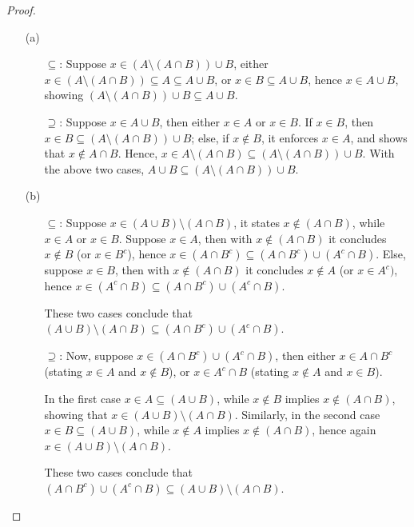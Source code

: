 \documentclass{article}
\begin{document}
\begin{proof}
    \begin{itemize}
        \item[(a)]
        \begin{itemize}
            \item[$\subseteq$:] Suppose $x\in (A\setminus (A\cap B))\cup B$, either $x\in (A\setminus (A\cap B))\subseteq A\subseteq A\cup B$, or $x\in B\subseteq A\cup B$, hence $x\in A\cup B$, showing $(A\setminus (A\cap B))\cup B\subseteq A\cup B$.
            \item[$\supseteq$:] Suppose $x\in A\cup B$, then either $x\in A$ or $x\in B$. If $x\in B$, then $x\in B\subseteq (A\setminus(A\cap B))\cup B$; else, if $x\notin B$, it enforces $x\in A$, and shows that $x\notin A\cap B$. Hence, $x\in A\setminus(A\cap B) \subseteq (A\setminus(A\cap B))\cup B$. With the above two cases, $A\cup B\subseteq (A\setminus(A\cap B))\cup B$.
        \end{itemize}
        \item[(b)]
        \begin{itemize}
            \item[$\subseteq$:] Suppose $x\in (A\cup B)\setminus (A\cap B)$, it states $x\notin (A\cap B)$, while $x\in A$ or $x\in B$. Suppose $x\in A$, then with $x\notin (A\cap B)$ it concludes $x\notin B$ (or $x\in B^c$), hence $x\in (A\cap B^c)\subseteq (A\cap B^c)\cup(A^c\cap B)$. Else, suppose $x\in B$, then with $x\notin (A\cap B)$ it concludes $x\notin A$ (or $x\in A^c)$, hence $x\in (A^c\cap B)\subseteq (A\cap B^c)\cup(A^c\cap B)$. 
            
            These two cases conclude that $(A\cup B)\setminus(A\cap B)\subseteq (A\cap B^c)\cup (A^c\cap B)$.

            \item[$\supseteq$:] Now, suppose $x\in (A\cap B^c)\cup (A^c\cap B)$, then either $x\in A\cap B^c$ (stating $x\in A$ and $x\notin B$), or $x\in A^c\cap B$ (stating $x\notin A$ and $x\in B$). 
            
            In the first case $x\in A\subseteq (A\cup B)$, while $x\notin B$ implies $x\notin (A\cap B)$, showing that $x\in (A\cup B)\setminus (A\cap B)$. Similarly, in the second case $x\in B\subseteq (A\cup B)$, while $x\notin A$ implies $x\notin (A\cap B)$, hence again $x\in (A\cup B)\setminus(A\cap B)$.

            These two cases conclude that $(A\cap B^c)\cup (A^c\cap B)\subseteq (A\cup B)\setminus(A\cap B)$.
        \end{itemize}
    \end{itemize}
\end{proof}
\end{document}
